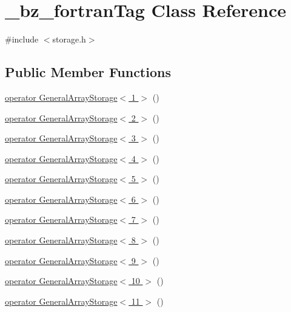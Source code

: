 \hypertarget{class__bz__fortranTag}{}\section{\+\_\+bz\+\_\+fortran\+Tag Class Reference}
\label{class__bz__fortranTag}


{\ttfamily \#include $<$storage.\+h$>$}

\subsection*{Public Member Functions}
\begin{DoxyCompactItemize}
\item 
\hyperlink{class__bz__fortranTag_ac7dc6235e45d495e78c1b1ef86bf2cc7}{operator General\+Array\+Storage$<$ 1 $>$} ()
\item 
\hyperlink{class__bz__fortranTag_a67b32ce3214852021e40fa3ba2d3cbd4}{operator General\+Array\+Storage$<$ 2 $>$} ()
\item 
\hyperlink{class__bz__fortranTag_af290740291e56c9cd597da88e28ed54f}{operator General\+Array\+Storage$<$ 3 $>$} ()
\item 
\hyperlink{class__bz__fortranTag_a90cd83fb285c8b500db87fb8fda6d1a6}{operator General\+Array\+Storage$<$ 4 $>$} ()
\item 
\hyperlink{class__bz__fortranTag_af2e6789575435114405c966a78283696}{operator General\+Array\+Storage$<$ 5 $>$} ()
\item 
\hyperlink{class__bz__fortranTag_ae519ec89fc89fd9a22cb02b06a80b984}{operator General\+Array\+Storage$<$ 6 $>$} ()
\item 
\hyperlink{class__bz__fortranTag_ab7bc68989b24c028fccd651898808ab5}{operator General\+Array\+Storage$<$ 7 $>$} ()
\item 
\hyperlink{class__bz__fortranTag_a58688faf8f26087b7dd69bd7b1500a23}{operator General\+Array\+Storage$<$ 8 $>$} ()
\item 
\hyperlink{class__bz__fortranTag_a427f812bc9817a1a2486c83e3d765985}{operator General\+Array\+Storage$<$ 9 $>$} ()
\item 
\hyperlink{class__bz__fortranTag_a61d0e069d39d829a5b3e048f22e147b6}{operator General\+Array\+Storage$<$ 10 $>$} ()
\item 
\hyperlink{class__bz__fortranTag_a71fb44999a16eb3bc9c489d6380a966d}{operator General\+Array\+Storage$<$ 11 $>$} ()
\end{DoxyCompactItemize}


